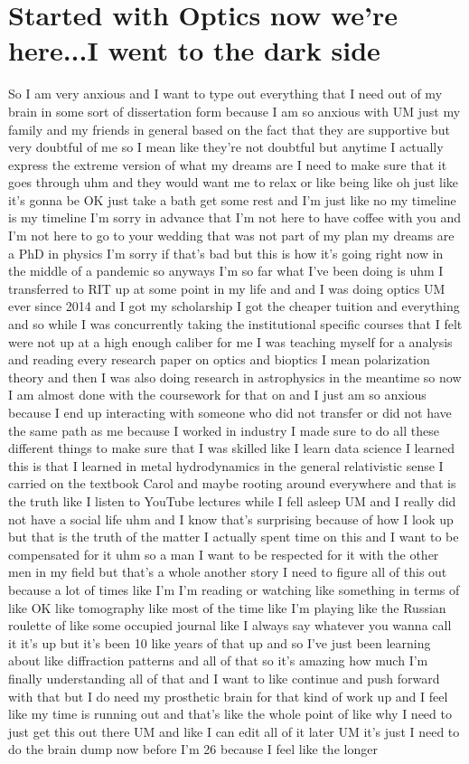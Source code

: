 \chapter{Started with Optics now we're here...I went to the dark side}

So I am very anxious and I want to type out everything that I need out of my brain in some sort of dissertation form because I am so anxious with UM just my family and my friends in general based on the fact that they are supportive but very doubtful of me so I mean like they're not doubtful but anytime I actually express the extreme version of what my dreams are I need to make sure that it goes through uhm and they would want me to relax or like being like oh just like it's gonna be OK just take a bath get some rest and I'm just like no my timeline is my timeline I'm sorry in advance that I'm not here to have coffee with you and I'm not here to go to your wedding that was not part of my plan my dreams are a PhD in physics I'm sorry if that's bad but this is how it's going right now in the middle of a pandemic so anyways I'm so far what I've been doing is uhm I transferred to RIT up at some point in my life and and I was doing optics UM ever since 2014 and I got my scholarship I got the cheaper tuition and everything and so while I was concurrently taking the institutional specific courses that I felt were not up at a high enough caliber for me I was teaching myself for a analysis and reading every research paper on optics and bioptics I mean polarization theory and then I was also doing research in astrophysics in the meantime so now I am almost done with the coursework for that on and I just am so anxious because I end up interacting with someone who did not transfer or did not have the same path as me because I worked in industry I made sure to do all these different things to make sure that I was skilled like I learn data science I learned this is that I learned in metal hydrodynamics in the general relativistic sense I carried on the textbook Carol and maybe rooting around everywhere and that is the truth like I listen to YouTube lectures while I fell asleep UM and I really did not have a social life uhm and I know that's surprising because of how I look up but that is the truth of the matter I actually spent time on this and I want to be compensated for it uhm so a man I want to be respected for it with the other men in my field but that's a whole another story I need to figure all of this out because a lot of times like I'm I'm reading or watching like something in terms of like OK like tomography like most of the time like I'm playing like the Russian roulette of like some occupied journal like I always say whatever you wanna call it it's up but it's been 10 like years of that up and so I've just been learning about like diffraction patterns and all of that so it's amazing how much I'm finally understanding all of that and I want to like continue and push forward with that but I do need my prosthetic brain for that kind of work up and I feel like my time is running out and that's like the whole point of like why I need to just get this out there UM and like I can edit all of it later UM it's just I need to do the brain dump now before I'm 26 because I feel like the longer 